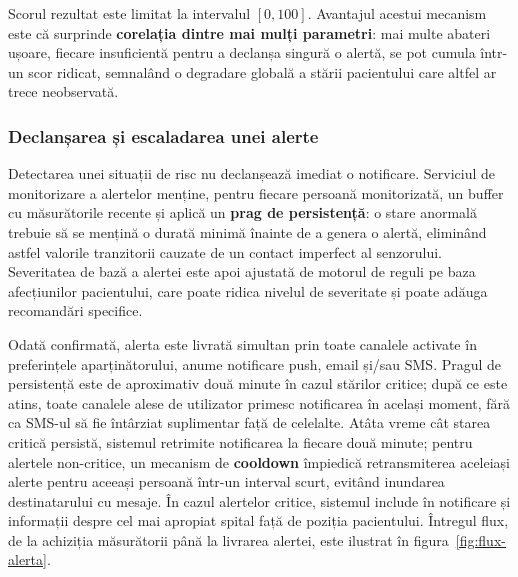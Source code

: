 \documentclass[12pt,a4paper]{article}
\begin{document}
Scorul rezultat este limitat la intervalul $[0, 100]$. Avantajul acestui mecanism este că surprinde \textbf{corelația dintre mai mulți parametri}: mai multe abateri ușoare, fiecare insuficientă pentru a declanșa singură o alertă, se pot cumula într-un scor ridicat, semnalând o degradare globală a stării pacientului care altfel ar trece neobservată.

\subsubsection{Declanșarea și escaladarea unei alerte}

Detectarea unei situații de risc nu declanșează imediat o notificare. Serviciul de monitorizare a alertelor menține, pentru fiecare persoană monitorizată, un buffer cu măsurătorile recente și aplică un \textbf{prag de persistență}: o stare anormală trebuie să se mențină o durată minimă înainte de a genera o alertă, eliminând astfel valorile tranzitorii cauzate de un contact imperfect al senzorului. Severitatea de bază a alertei este apoi ajustată de motorul de reguli pe baza afecțiunilor pacientului, care poate ridica nivelul de severitate și poate adăuga recomandări specifice.

Odată confirmată, alerta este livrată simultan prin toate canalele activate în preferințele aparținătorului, anume notificare push, email și/sau SMS. Pragul de persistență este de aproximativ două minute în cazul stărilor critice; după ce este atins, toate canalele alese de utilizator primesc notificarea în același moment, fără ca SMS-ul să fie întârziat suplimentar față de celelalte. Atâta vreme cât starea critică persistă, sistemul retrimite notificarea la fiecare două minute; pentru alertele non-critice, un mecanism de \textbf{cooldown} împiedică retransmiterea aceleiași alerte pentru aceeași persoană într-un interval scurt, evitând inundarea destinatarului cu mesaje. În cazul alertelor critice, sistemul include în notificare și informații despre cel mai apropiat spital față de poziția pacientului. Întregul flux, de la achiziția măsurătorii până la livrarea alertei, este ilustrat în figura~\ref{fig:flux-alerta}.
\end{document}
